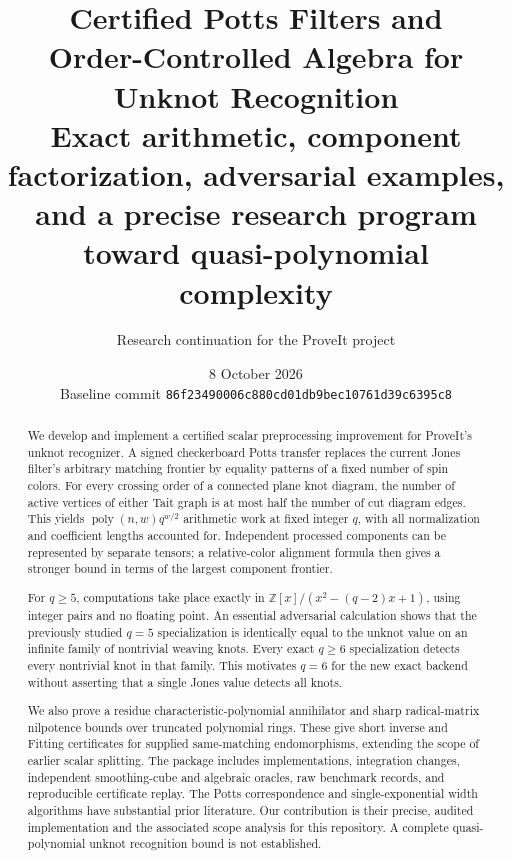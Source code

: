 \documentclass[11pt,letterpaper]{article}
\title{\LARGE\bfseries Certified Potts Filters and\\[0.3em]
Order-Controlled Algebra for\\[0.3em]Unknot Recognition\\[0.7em]
\large Exact arithmetic, component factorization, adversarial examples,\\
and a precise research program toward quasi-polynomial complexity}
\author{Research continuation for the ProveIt project}
\date{8 October 2026\\[0.3em]\small Baseline commit
\texttt{86f23490006c880cd01db9bec10761d39c6395c8}}
\theoremstyle{definition}
\theoremstyle{remark}
\newcommand{\Z}{\mathbb Z}
\newcommand{\poly}{\operatorname{poly}}
\begin{document}
\maketitle
\begin{abstract}
We develop and implement a certified scalar preprocessing improvement for
ProveIt's unknot recognizer. A signed checkerboard Potts transfer replaces
the current Jones filter's arbitrary matching frontier by equality patterns
of a fixed number of spin colors. For every crossing order of a connected
plane knot diagram, the number of active vertices of either Tait graph is
at most half the number of cut diagram edges. This yields
$\poly(n,w)q^{w/2}$ arithmetic work at fixed integer $q$, with all normalization
and coefficient lengths accounted for. Independent processed components
can be represented by separate tensors; a relative-color alignment formula
then gives a stronger bound in terms of the largest component frontier.

For $q\ge5$, computations take place exactly in
$\Z[x]/(x^2-(q-2)x+1)$, using integer pairs and no floating point.
An essential adversarial calculation shows that the previously studied
$q=5$ specialization is identically equal to the unknot value on an infinite
family of nontrivial weaving knots. Every exact $q\ge6$ specialization
detects every nontrivial knot in that family. This motivates $q=6$ for the
new exact backend without asserting that a single Jones value detects
all knots.

We also prove a residue characteristic-polynomial annihilator and sharp
radical-matrix nilpotence bounds over truncated polynomial rings. These
give short inverse and Fitting certificates for supplied same-matching
endomorphisms, extending the scope of earlier scalar splitting.
The package includes implementations, integration changes, independent
smoothing-cube and algebraic oracles, raw benchmark records, and reproducible
certificate replay. The Potts correspondence and single-exponential
width algorithms have substantial prior literature. Our contribution is
their precise, audited implementation and the associated scope analysis
for this repository. A complete quasi-polynomial unknot recognition bound
is not established.
\end{abstract}
\clearpage
\tableofcontents
\clearpage












\clearpage
\begingroup
\raggedright
\small


\endgroup
\end{document}
